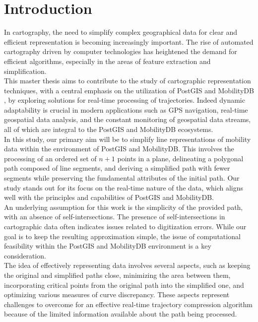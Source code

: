 
\chapter{Introduction}

In cartography, the need to simplify complex geographical data for clear and efficient representation is becoming increasingly important. The rise of automated cartography driven by computer technologies has heightened the demand for efficient algorithms, especially in the areas of feature extraction and simplification.\\

This master thesis aims to contribute to the study of cartographic representation techniques, with a central emphasis on the utilization of PostGIS and MobilityDB \cite{MobilityDBTODS2020}, by exploring solutions for real-time processing of trajectories. Indeed dynamic adaptability is crucial in modern applications such as GPS navigation, real-time geospatial data analysis, and the constant monitoring of geospatial data streams, all of which are integral to the PostGIS and MobilityDB ecosystems.\\

In this study, our primary aim will be to simplify line representations of mobility data within the environment of PostGIS and MobilityDB. This involves the processing of an ordered set of \(n+1\) points in a plane, delineating a polygonal path composed of line segments, and deriving a simplified path with fewer segments while preserving the fundamental attributes of the initial path. Our study stands out for its focus on the real-time nature of the data, which aligns well with the principles and capabilities of PostGIS and MobilityDB.\\

An underlying assumption for this work is the simplicity of the provided path, with an absence of self-intersections. The presence of self-intersections in cartographic data often indicates issues related to digitization errors. While our goal is to keep the resulting approximation simple, the issue of computational feasibility within the PostGIS and MobilityDB environment is a key consideration.\\

The idea of effectively representing data involves several aspects, such as keeping the original and simplified paths close, minimizing the area between them, incorporating critical points from the original path into the simplified one, and optimizing various measures of curve discrepancy. These aspects represent challenges to overcome for an effective real-time trajectory compression algorithm because of the limited information available about the path being processed.\\


